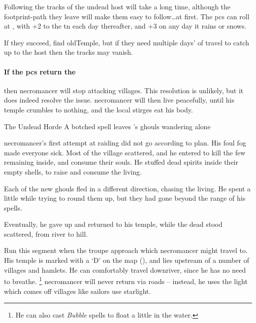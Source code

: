 Following the tracks of the undead host will take a long time, although the footprint-path they leave will make them easy to follow\ldots at first.
The \glspl{pc} can roll  at \tn[5], with +2 to the \gls{tn} each day thereafter, and +3 on any day it rains or snows.

If they succeed, find \gls{oldTemple}, but if they need multiple days' of travel to catch up to the host then the tracks may vanish.

\paragraph{If the \glspl{pc} return the }
then \gls{necromancer} will stop attacking \glspl{village}.
This resolution is unlikely, but it does indeed resolve the issue.
\Gls{necromancer} will then live peacefully, until his temple crumbles to nothing, and the local stirges eat his body.

{The Undead Horde}%
{A botched spell leaves 's ghouls wandering alone}%
\label{necroHorde}

\begin{exampletext}
  \Gls{necromancer}'s first attempt at raiding  did not go according to plan.
  His foul fog made everyone sick.
  Most of the \gls{village} scattered, and he entered to kill the few remaining inside, and consume their souls.
  He stuffed dead spirits inside their empty shells, to raise and consume the living.

  Each of the new ghouls fled in a different direction, chasing the living.
  He spent a little while trying to round them up, but they had gone beyond the range of his spells.

  Eventually, he gave up and returned to his temple, while the dead stood scattered, from river to hill.
\end{exampletext}

Run this \gls{segment} when the troupe approach  which \gls{necromancer} might travel to.
His temple is marked with a `\gls{D}' on the map (), and lies upstream of a number of \glspl{village} and hamlets.
He can comfortably travel downriver, since he has no need to breathe.%
\footnote{He can also cast \textit{Bubble} spells to float a little in the water.}
\Gls{necromancer} will never return via roads -- instead, he uses the light which comes off \glspl{village} like sailors use starlight.

